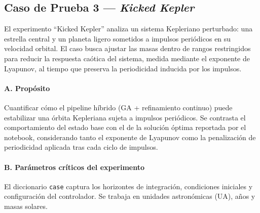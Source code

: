 \subsection{Caso de Prueba 3 — \textit{Kicked Kepler}}

El experimento “Kicked Kepler” analiza un sistema Kepleriano perturbado: una estrella central y un planeta ligero sometidos a impulsos periódicos en su velocidad orbital. El caso busca ajustar las masas dentro de rangos restringidos para reducir la respuesta caótica del sistema, medida mediante el exponente de Lyapunov, al tiempo que preserva la periodicidad inducida por los impulsos.

\paragraph{A. Propósito}
Cuantificar cómo el pipeline híbrido (GA + refinamiento continuo) puede estabilizar una órbita Kepleriana sujeta a impulsos periódicos. Se contrasta el comportamiento del estado base con el de la solución óptima reportada por el notebook, considerando tanto el exponente de Lyapunov como la penalización de periodicidad aplicada tras cada ciclo de impulsos.

\paragraph{B. Parámetros críticos del experimento}
El diccionario \texttt{case} captura los horizontes de integración, condiciones iniciales y configuración del controlador. Se trabaja en unidades astronómicas (UA), años y masas solares.

